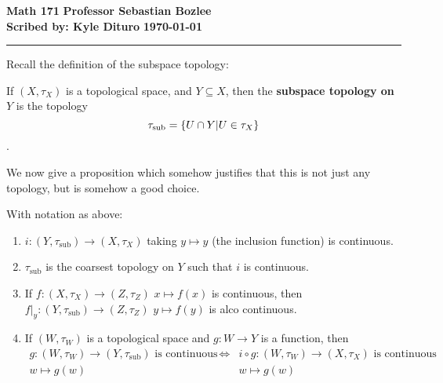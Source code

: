 \documentclass[12pt, twosided]{article}
\begin{document}
\noindent \textbf{Math 171} \hfill \textbf{Professor Sebastian Bozlee} \\
\textbf{Scribed by: Kyle Dituro} \hfill \textbf{\today}\hrule
\vspace{.2in}

Recall the definition of the subspace topology:

\begin{df}
  If \((X, \tau_X)\) is a topological space, and \(Y \subseteq X\), then the \textbf{subspace topology on }\(Y\) is the topology \[\tau_{\text{sub}} = \left\{ U \cap Y \middle\vert U \in \tau_X \right\}\].
\end{df}

We now give a proposition which somehow justifies that this is not just any topology, but is somehow a good choice.

\begin{prop}
  With notation as above:
  \begin{enumerate}
  \item \(i: (Y, \tau_{\mathrm{sub}}) \to (X, \tau_X)\) taking \(y \mapsto y\) (the inclusion function) is continuous.
  \item \(\tau_{\mathrm{sub}}\) is the coarsest topology on \(Y\) such that \(i\) is continuous.
  \item If \(f: (X, \tau_X) \to (Z, \tau_Z)\) \(x \mapsto f(x)\) is continuous, then \(f\vert_y : (Y, \tau_\mathrm{sub}) \to (Z, \tau_Z)\) \(y \mapsto f(y)\) is alco continuous.
  \item If \((W, \tau_W)\) is a topological space and \(g: W \to Y\) is a function, then
    \begin{align*}
      g:(W, \tau_W) \to (Y, \tau_{\mathrm{sub}}) \text{ is continuous } &\Leftrightarrow& i \circ g : (W , \tau_W) \to (X, \tau_X) \text{ is continuous} \\
      w \mapsto g(w) & & w \mapsto g(w)
    \end{align*}
  \end{enumerate}
\end{prop}
\end{document}
